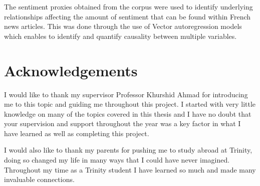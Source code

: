 \documentclass[a4paper,oneside,12pt]{book}
\begin{document}
The sentiment proxies obtained from the corpus were used to identify underlying relationships affecting the amount of sentiment that can be found within French news articles. This was done through the use of Vector autoregression models which enables to identify and quantify causality between multiple variables.

\newpage
\onehalfspacing\raggedright %

\section*{\Huge{Acknowledgements}}

I would like to thank my supervisor Professor Khurshid Ahmad for introducing me to this topic and guiding me throughout this project. I started with very little knowledge on many of the topics covered in this thesis and I have no doubt that your supervision and support throughout the year was a key factor in what I have learned as well as completing this project.

I would also like to thank my parents for pushing me to study abroad at Trinity, doing so changed my life in many ways that I could have never imagined. Throughout my time as a Trinity student I have learned so much and made many invaluable connections.

\tableofcontents

\mainmatter
\listoffigures
\listoftables







\end{document}

